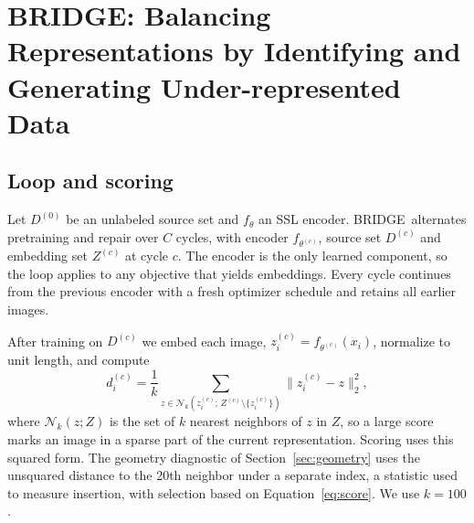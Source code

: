 \documentclass{article}
\newcommand{\method}{BRIDGE}
\begin{document}
\section{BRIDGE: Balancing Representations by Identifying and Generating Under-represented Data}
\label{sec:method}
\subsection{Loop and scoring}
Let $D^{(0)}$ be an unlabeled source set and $f_\theta$ an SSL encoder. \method\ alternates pretraining and repair over $C$ cycles, with encoder $f_{\theta^{(c)}}$, source set $D^{(c)}$ and embedding set $Z^{(c)}$ at cycle $c$. The encoder is the only learned component, so the loop applies to any objective that yields embeddings. Every cycle continues from the previous encoder with a fresh optimizer schedule and retains all earlier images.

After training on $D^{(c)}$ we embed each image, $z_i^{(c)}=f_{\theta^{(c)}}(x_i)$, normalize to unit length, and compute
\begin{equation}
d_i^{(c)}=\frac{1}{k}\sum_{z\in\mathcal N_k(z_i^{(c)};\,Z^{(c)}\setminus\{z_i^{(c)}\})}\lVert z_i^{(c)}-z\rVert_2^2,
\label{eq:score}
\end{equation}
where $\mathcal N_k(z;Z)$ is the set of $k$ nearest neighbors of $z$ in $Z$, so a large score marks an image in a sparse part of the current representation. Scoring uses this squared form. The geometry diagnostic of Section~\ref{sec:geometry} uses the unsquared distance to the 20th neighbor under a separate index, a statistic used to measure insertion, with selection based on Equation~\ref{eq:score}. We use $k=100$.
\end{document}
